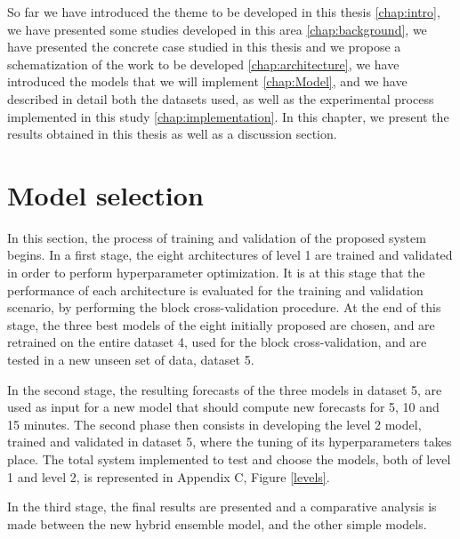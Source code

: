 \cleardoublepage
\label{chap:results}

So far we have introduced the theme to be developed in this thesis \ref{chap:intro}, we have presented some studies developed in this area \ref{chap:background}, we have presented the concrete case studied in this thesis and we propose a schematization of the work to be developed \ref{chap:architecture}, we have introduced the models that we will implement \ref{chap:Model}, and we have described in detail both the datasets used, as well as the experimental process implemented in this study \ref{chap:implementation}. In this chapter, we present the results obtained in this thesis as well as a discussion section.


\section{Model selection} \label{chap5:framework}

In this section, the process of training and validation of the proposed system begins. In a first stage, the eight architectures of level 1 are trained and validated in order to perform hyperparameter optimization. It is at this stage that the performance of each architecture is evaluated for the training and validation scenario, by performing the block cross-validation procedure. At the end of this stage, the three best models of the eight initially proposed are chosen, and are retrained on the entire dataset 4, used for the block cross-validation, and are tested in a new unseen set of data, dataset 5.

In the second stage, the resulting forecasts of the three models in dataset 5, are used as input for a new model that should compute new forecasts for 5, 10 and 15 minutes. The second phase then consists in developing the level 2 model, trained and validated in dataset 5, where the tuning of its hyperparameters takes place. The total system implemented to test and choose the models, both of level 1 and level 2, is represented in Appendix C, Figure \ref{levels}.

In the third stage, the final results are presented and a comparative analysis is made between the new hybrid ensemble model, and the other simple models.

